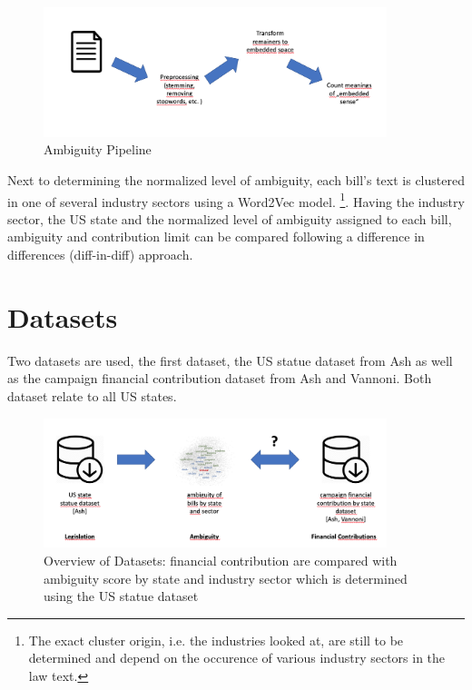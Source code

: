 \documentclass[a4paper, 12pt]{article}
\begin{document}
\begin{figure}[H]
\begin{center}
\includegraphics[width=10cm]{imgs/overview_approach}
\end{center}
\caption{Ambiguity Pipeline}
\label{fig:overview_approach}
\end{figure}

Next to determining the normalized level of ambiguity, each bill's text is clustered in one of several industry sectors using a Word2Vec model. \footnote{The exact cluster origin, i.e. the industries looked at, are still to be determined and depend on the occurence of various industry sectors in the law text.}. Having the industry sector, the US state and the normalized level of ambiguity assigned to each bill, ambiguity and contribution limit can be compared following a difference in differences (diff-in-diff) approach.

\section*{Datasets}
Two datasets are used, the first dataset, the US statue dataset from Ash as well as the campaign financial contribution dataset from Ash and Vannoni. Both dataset relate to all US states.

\begin{figure}[H]
\begin{center}
\includegraphics[width=10cm]{imgs/overview_datasets}
\end{center}
\caption{Overview of Datasets: financial contribution are compared with ambiguity
score by state and industry sector which is determined using the US statue
dataset}
\label{fig:overview_datasets}
\end{figure}
\end{document}
